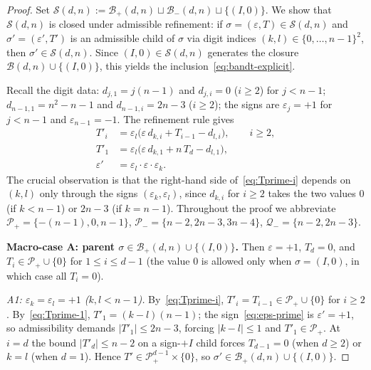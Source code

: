 \documentclass{amsart}
\theoremstyle{definition}
\theoremstyle{remark}
\begin{document}
\begin{proof}
Set $\mathcal{S}(d, n) := \mathcal{B}_+(d, n) \sqcup \mathcal{B}_-(d, n)
\sqcup \{(I, 0)\}$.  We show that $\mathcal{S}(d, n)$ is closed under
admissible refinement: if $\sigma = (\varepsilon, T) \in \mathcal{S}(d, n)$
and $\sigma' = (\varepsilon', T')$ is an admissible child of $\sigma$
via digit indices $(k, l) \in \{0, \ldots, n-1\}^2$, then
$\sigma' \in \mathcal{S}(d, n)$.  Since $(I, 0) \in \mathcal{S}(d, n)$
generates the closure $\mathcal{B}(d, n) \cup \{(I, 0)\}$, this
yields the inclusion~\eqref{eq:bandt-explicit}.

Recall the digit data: $d_{j, 1} = j(n-1)$ and $d_{j, i} = 0$
($i \ge 2$) for $j < n-1$; $d_{n-1, 1} = n^2 - n - 1$ and
$d_{n-1, i} = 2n-3$ ($i \ge 2$); the signs are $\varepsilon_j = +1$
for $j < n-1$ and $\varepsilon_{n-1} = -1$.  The refinement rule
gives
\begin{align}
  T'_i &= \varepsilon_l\bigl(\varepsilon\, d_{k, i} + T_{i-1}
           - d_{l, i}\bigr), \qquad i \ge 2, \label{eq:Tprime-i}\\
  T'_1 &= \varepsilon_l\bigl(\varepsilon\, d_{k, 1} + n\, T_d
           - d_{l, 1}\bigr), \label{eq:Tprime-1}\\
  \varepsilon' &= \varepsilon_l \cdot \varepsilon \cdot \varepsilon_k.
       \label{eq:eps-prime}
\end{align}
The crucial observation is that the right-hand side
of~\eqref{eq:Tprime-i} depends on $(k, l)$ only through the signs
$(\varepsilon_k, \varepsilon_l)$, since $d_{k, i}$ for $i \ge 2$
takes the two values $0$ (if $k < n-1$) or $2n-3$ (if $k = n-1$).
Throughout the proof we abbreviate
$\mathcal{P}_+ = \{-(n-1), 0, n-1\}$,
$\mathcal{P}_- = \{n-2, 2n-3, 3n-4\}$,
$\mathcal{Q}_- = \{n-2, 2n-3\}$.

\smallskip\noindent\textbf{Macro-case A: parent
$\sigma \in \mathcal{B}_+(d, n) \cup \{(I, 0)\}$.}
Then $\varepsilon = +1$, $T_d = 0$, and $T_i \in \mathcal{P}_+ \cup \{0\}$
for $1 \le i \le d-1$ (the value $0$ is allowed only when
$\sigma = (I, 0)$, in which case all $T_i = 0$).

\emph{A1: $\varepsilon_k = \varepsilon_l = +1$ ($k, l < n-1$).}
By~\eqref{eq:Tprime-i}, $T'_i = T_{i-1} \in \mathcal{P}_+ \cup \{0\}$
for $i \ge 2$.  By~\eqref{eq:Tprime-1}, $T'_1 = (k - l)(n-1)$;
the sign~\eqref{eq:eps-prime} is $\varepsilon' = +1$, so admissibility
demands $|T'_1| \le 2n-3$, forcing $|k - l| \le 1$ and
$T'_1 \in \mathcal{P}_+$.  At $i = d$ the bound $|T'_d| \le n-2$
on a sign-$+I$ child forces $T_{d-1} = 0$ (when $d \ge 2$) or
$k = l$ (when $d = 1$).  Hence $T' \in \mathcal{P}_+^{d-1} \times \{0\}$,
so $\sigma' \in \mathcal{B}_+(d, n) \cup \{(I, 0)\}$.


\end{proof}
\end{document}
